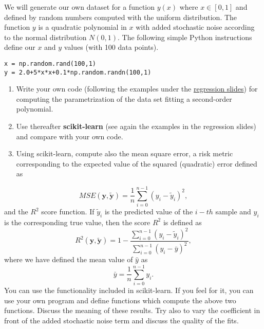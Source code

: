 \documentclass[%
oneside,                 %
final,                   %
10pt]{article}
\newenvironment{doconceexercise}{}{}
\newcounter{doconceexercisecounter}
\begin{document}
\begin{doconceexercise}

                             

We will generate our own dataset for a function $y(x)$ where $x \in [0,1]$ and defined by random numbers computed with the uniform distribution. The function $y$ is a quadratic polynomial in $x$ with added stochastic noise according to the normal distribution $N(0,1)$.
The following simple Python instructions define our $x$ and $y$ values (with 100 data points).



\begin{verbatim}
x = np.random.rand(100,1)
y = 2.0+5*x*x+0.1*np.random.randn(100,1)

\end{verbatim}


\begin{enumerate}
\item Write your own code (following the examples under the \href{{https://compphysics.github.io/MachineLearningECT/doc/pub/Day1/html/Day1-bs.html}}{regression slides}) for computing the parametrization of the data set fitting a second-order polynomial. 

\item Use thereafter \textbf{scikit-learn} (see again the examples in the regression slides) and compare with your own code.   

\item Using scikit-learn, compute also the mean square error, a risk metric corresponding to the expected value of the squared (quadratic) error defined as
\end{enumerate}

\noindent
\[ MSE(\bm{y},\bm{\tilde{y}}) = \frac{1}{n}
\sum_{i=0}^{n-1}(y_i-\tilde{y}_i)^2, 
\] 
and the $R^2$ score function.
If $\tilde{y}_i$ is the predicted value of the $i-th$ sample and $y_i$ is the corresponding true value, then the score $R^2$ is defined as
\[
R^2(\bm{y}, \tilde{\bm{y}}) = 1 - \frac{\sum_{i=0}^{n - 1} (y_i - \tilde{y}_i)^2}{\sum_{i=0}^{n - 1} (y_i - \bar{y})^2},
\]
where we have defined the mean value  of $\hat{y}$ as
\[
\bar{y} =  \frac{1}{n} \sum_{i=0}^{n - 1} y_i.
\]
You can use the functionality included in scikit-learn. If you feel for it, you can use your own program and define functions which compute the above two functions. 
Discuss the meaning of these results. Try also to vary the coefficient in front of the added stochastic noise term and discuss the quality of the fits.


\end{doconceexercise}
\end{document}
